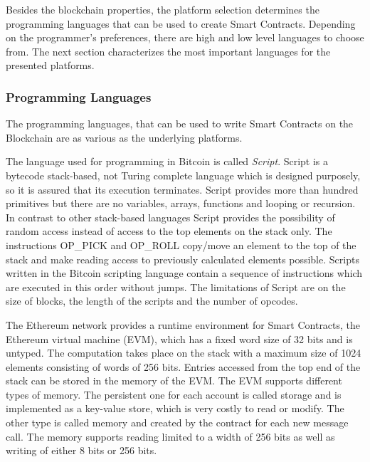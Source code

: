 \documentclass[conference]{IEEEtran}
\begin{document}
Besides the blockchain properties, the platform selection determines the programming languages that can be used to create Smart Contracts. Depending on the programmer's preferences, there are high and low level languages to choose from. The next section characterizes the most important languages for the presented platforms.
\subsubsection{Programming Languages}
The programming languages, that can be used to write Smart Contracts on the Blockchain are as various as the underlying platforms. \par 
The language used for programming in Bitcoin is called \textit{Script}. Script is a bytecode stack-based, not Turing complete language which is designed purposely, so it is assured that its execution terminates. Script provides more than hundred primitives but there are no variables, arrays, functions and looping or recursion. In contrast to other stack-based languages Script provides the possibility of random access instead of access to the top elements on the stack only. The instructions OP\_PICK and OP\_ROLL copy/move an element to the top of the stack and make reading access to previously calculated elements possible. Scripts written in the Bitcoin scripting language contain a sequence of instructions which are executed in this order without jumps. The limitations of Script are on the size of blocks, the length of the scripts and the number of opcodes. \cite{McAdams2017} \par 
The Ethereum network provides a runtime environment for Smart Contracts, the Ethereum virtual machine (EVM), which has a fixed word size of 32 bits and is untyped. The computation takes place on the stack with a maximum size of 1024 elements consisting of words of 256 bits. Entries accessed from the top end of the stack can be stored in the memory of the EVM. The EVM supports different types of memory. The persistent one for each account is called storage and is implemented as a key-value store, which is very costly to read or modify. The other type is called memory and created by the contract for each new message call. The memory supports reading limited to a width of 256 bits as well as writing of either 8 bits or 256 bits. \cite{Solidity2017} \par 
\end{document}
